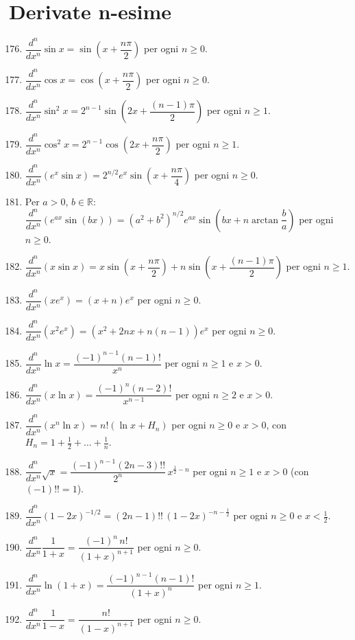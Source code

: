 \documentclass[11pt,a4paper]{article}
\begin{document}
\section*{Derivate n-esime}
\begin{enumerate}
\setcounter{enumi}{175}
\item $\dfrac{d^n}{dx^n}\sin x=\sin\left(x+\dfrac{n\pi}{2}\right)$ per ogni $n\ge0$.
\item $\dfrac{d^n}{dx^n}\cos x=\cos\left(x+\dfrac{n\pi}{2}\right)$ per ogni $n\ge0$.
\item $\dfrac{d^n}{dx^n}\sin^2x=2^{n-1}\sin\left(2x+\dfrac{(n-1)\pi}{2}\right)$ per ogni $n\ge1$.
\item $\dfrac{d^n}{dx^n}\cos^2x=2^{n-1}\cos\left(2x+\dfrac{n\pi}{2}\right)$ per ogni $n\ge1$.
\item $\dfrac{d^n}{dx^n}\left(e^{x}\sin x\right)=2^{n/2}e^{x}\sin\left(x+\dfrac{n\pi}{4}\right)$ per ogni $n\ge0$.
\item Per $a>0$, $b\in\mathbb{R}$: $\dfrac{d^n}{dx^n}\left(e^{ax}\sin(bx)\right)=\left(a^2+b^2\right)^{n/2}e^{ax}\sin\left(bx+n\arctan\dfrac{b}{a}\right)$ per ogni $n\ge0$.
\item $\dfrac{d^n}{dx^n}\left(x\sin x\right)=x\sin\left(x+\dfrac{n\pi}{2}\right)+n\sin\left(x+\dfrac{(n-1)\pi}{2}\right)$ per ogni $n\ge1$.
\item $\dfrac{d^n}{dx^n}\left(xe^{x}\right)=(x+n)e^{x}$ per ogni $n\ge0$.
\item $\dfrac{d^n}{dx^n}\left(x^2e^{x}\right)=\left(x^2+2nx+n(n-1)\right)e^{x}$ per ogni $n\ge0$.
\item $\dfrac{d^n}{dx^n}\ln x=\dfrac{(-1)^{n-1}(n-1)!}{x^n}$ per ogni $n\ge1$ e $x>0$.
\item $\dfrac{d^n}{dx^n}\left(x\ln x\right)=\dfrac{(-1)^n(n-2)!}{x^{n-1}}$ per ogni $n\ge2$ e $x>0$.
\item $\dfrac{d^n}{dx^n}\left(x^n\ln x\right)=n!\left(\ln x+H_n\right)$ per ogni $n\ge0$ e $x>0$, con $H_n=1+\frac12+\dots+\frac1n$.
\item $\dfrac{d^n}{dx^n}\sqrt{x}=\dfrac{(-1)^{n-1}(2n-3)!!}{2^n}\,x^{\frac12-n}$ per ogni $n\ge1$ e $x>0$ (con $(-1)!!=1$).
\item $\dfrac{d^n}{dx^n}(1-2x)^{-1/2}=(2n-1)!!\,(1-2x)^{-n-\frac12}$ per ogni $n\ge0$ e $x<\frac12$.
\item $\dfrac{d^n}{dx^n}\dfrac{1}{1+x}=\dfrac{(-1)^n\,n!}{(1+x)^{n+1}}$ per ogni $n\ge0$.
\item $\dfrac{d^n}{dx^n}\ln(1+x)=\dfrac{(-1)^{n-1}(n-1)!}{(1+x)^n}$ per ogni $n\ge1$.
\item $\dfrac{d^n}{dx^n}\dfrac{1}{1-x}=\dfrac{n!}{(1-x)^{n+1}}$ per ogni $n\ge0$.
\end{enumerate}
\end{document}
